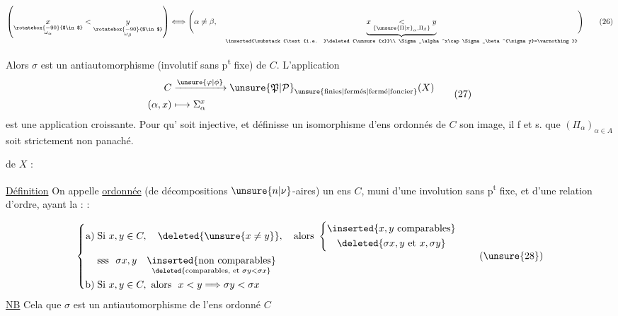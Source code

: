 \begingroup\makeatletter\tagsleft@true\makeatother
\[
\left(
\underset{\substack{\rotatebox{-90}{$\in$}\\\omega_\alpha}}{x}
<
\underset{\substack{\rotatebox{-90}{$\in$}\\\omega_\beta}}{y}
\right)
\Longleftrightarrow
\Biggl(\alpha\ne\beta,\quad
\underbrace{x\underset{\{\unsure{\Pi|\pi}_\alpha,\Pi_\beta\}}{<}y}_{
\inserted{\substack{\text{i.e. }\deleted{\unsure{x}}\\
\Sigma_\alpha^x\cap\Sigma_\beta^{\sigma y}=\varnothing}}}
\Biggr)
\tag*{(26)}
\]

Alors $\sigma$ est un antiautomorphisme (involutif sans p\textsuperscript{t} fixe) de $C$. L'application
\[
\begin{aligned}
C&\xrightarrow{\unsure{\varphi|\phi}}{\unsure{\mathfrak{P}|\mathcal{P}}}_{\unsure{\text{finies}|\text{fermés}|\text{fermé}|\text{foncier}}}(X)\\
(\alpha,x)&\longmapsto\Sigma_\alpha^x
\end{aligned}
\tag*{(27)}
\]
est une application croissante. Pour qu' soit injective, et définisse un isomorphisme d'ens ordonnés de $C$  son image, il f et s. que $(\Pi_\alpha)_{\alpha\in A}$ soit strictement non panaché.

 de $X$ :

\uline{Définition} On appelle \uline{  ordonnée} (de décompositions $\unsure{n|\nu}$-aires) un ens   $C$, muni d'une involution \inserted{$\unsure{\sigma}$} sans p\textsuperscript{t} fixe, et d'une relation d'ordre, ayant la :   :



  

\[
\left\{
\begin{aligned}
\text{a)}\;&\text{Si }x,y\in C,\quad\deleted{\unsure{x\ne y}},\quad\text{alors }\left\{
\begin{gathered}
\inserted{x,y\text{ comparables}}\\
\deleted{\sigma x,y\text{ et }x,\sigma y}
\end{gathered}\right.\\
&\text{sss }\ \sigma x,y\quad
\underset{\deleted{\text{comparables, et }\sigma y<\sigma x}}{\inserted{\text{non comparables}}}\\
\text{b)}\;&\text{Si }x,y\in C,\ \text{alors }\ x<y\Longrightarrow\sigma y<\sigma x
\end{aligned}\right.
\tag*{(\unsure{28})}
\]
\uline{NB} Cela  que $\sigma$ est un antiautomorphisme de l'ens ordonné $C$

\endgroup

\clearpage
